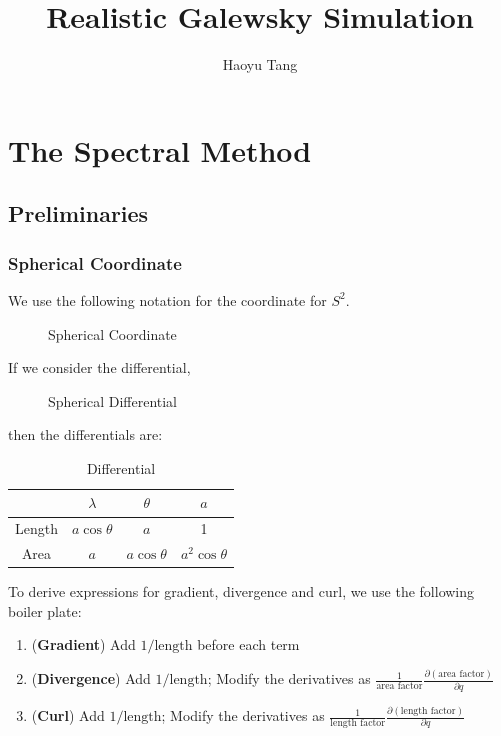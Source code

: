 \documentclass[14pt, twocolumn]{article}
\title{Realistic Galewsky Simulation}
\author{Haoyu Tang}
\begin{document}
\maketitle

\section{The Spectral Method}
\subsection{Preliminaries}
\subsubsection{Spherical Coordinate}

We use the following notation for the coordinate for $S^2$.
\begin{figure}[h]
    \centering
    
    \caption{Spherical Coordinate}
    \label{fig:sc}
\end{figure}

If we consider the differential, 
\begin{figure}[h]
    \centering
    
    \caption{Spherical Differential}
    \label{fig:placeholder}
\end{figure}

then the differentials are:

\begin{table}[h]
    \centering
    \begin{tabular}{c|c|c|c}
            & $\lambda$  & $\theta$  & $a$ \\
            \hline \hline 
    Length  & $a\cos \theta$ & $a$ & 1 \\
    \hline 
    Area    & $a$ & $a\cos\theta $ & $a^2\cos\theta$ \\
    \end{tabular}
    \caption{Differential}
    \label{tab:scf}
\end{table}

To derive expressions for gradient, divergence and curl, we use the following boiler plate:
\begin{enumerate}
    \item (\textbf{Gradient}) Add $1/\text{length}$  before each term
    \item (\textbf{Divergence})  Add $1/\text{length}$; Modify the derivatives as $\frac{1}{\text{area factor}}\frac{\partial(\text{area factor})}{\partial q}$
    \item (\textbf{Curl}) Add $1/\text{length}$; Modify the derivatives as $\frac{1}{\text{length factor}}\frac{\partial(\text{length factor})}{\partial q}$

\end{enumerate}
\end{document}
